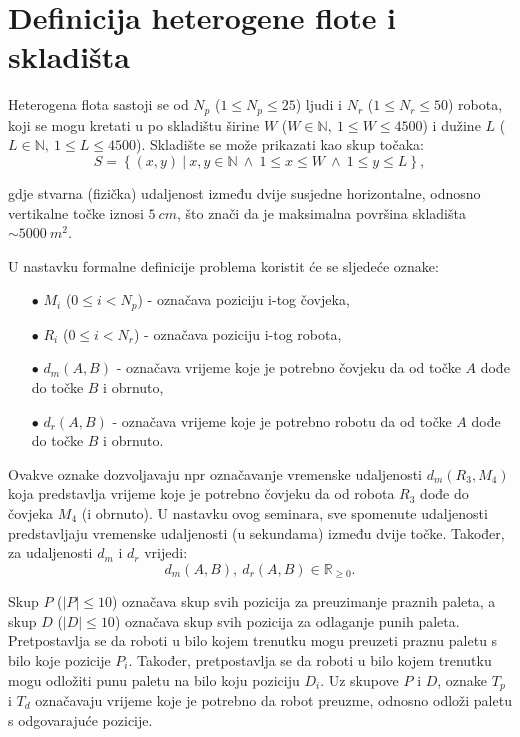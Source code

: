 \documentclass[times, utf8, seminar]{fer}
\begin{document}
\section{Definicija heterogene flote i skladišta}

Heterogena flota sastoji se od $N_p$ ($1 \le N_p \le 25$) ljudi i
 $N_r$ ($1 \le N_r \le 50$) robota,
koji se mogu kretati u po skladištu širine $W$ ($W \in \mathbb{N},\ 1 \le W \le 4500$)
i  dužine $L$ ($L \in \mathbb{N},\ 1 \le L \le 4500$).
Skladište se može prikazati kao skup točaka:
\begin{equation}
S = \left\{(x, y)\ |\ x, y \in \mathbb{N}\ \land\ 1 \le x \le W\ \land\ 1 \le y \le L\right\},
\end{equation}

gdje stvarna (fizička) udaljenost između dvije susjedne horizontalne, odnosno vertikalne točke
iznosi $5\ cm$, što znači da je maksimalna površina skladišta
$\sim5000\ m^2$.

U nastavku formalne definicije problema koristit će se sljedeće oznake:
\begin{itemize}
    \item[$\bullet$] $M_i$ ($0 \le i < N_p$) - označava poziciju i-tog čovjeka,
    \item[$\bullet$] $R_i$ ($0 \le i < N_r$) - označava poziciju i-tog robota,
    \item[$\bullet$] $d_m(A, B)$ - označava vrijeme koje je potrebno čovjeku da od točke $A$ dođe do točke $B$ i obrnuto,
    \item[$\bullet$] $d_r(A, B)$ - označava vrijeme koje je potrebno robotu da od točke $A$ dođe do točke $B$ i obrnuto.
\end{itemize}

Ovakve oznake dozvoljavaju npr označavanje vremenske udaljenosti $d_m(R_3, M_4)$ koja
predstavlja vrijeme koje je potrebno čovjeku da od robota $R_3$ dođe do čovjeka
$M_4$ (i obrnuto).
U nastavku ovog seminara, sve spomenute udaljenosti predstavljaju vremenske udaljenosti (u sekundama) između
dvije točke. Također, za udaljenosti $d_m$ i $d_r$ vrijedi:
\begin{equation}
d_m(A, B),\ d_r(A, B) \in \mathbb{R}_{\ge0}.
\end{equation}

Skup $P$ ($|P| \le 10$) označava skup svih pozicija za preuzimanje praznih paleta,
a skup $D$ ($|D| \le 10$) označava skup svih pozicija za odlaganje punih paleta. Pretpostavlja
se da roboti u bilo kojem trenutku mogu preuzeti praznu paletu s bilo koje pozicije $P_i$.
Također, pretpostavlja se da roboti u bilo kojem trenutku mogu odložiti punu paletu na bilo
koju poziciju $D_i$. Uz skupove $P$ i $D$, oznake $T_p$ i $T_d$ označavaju
vrijeme koje je potrebno da robot preuzme, odnosno odloži paletu s
odgovarajuće pozicije.
\end{document}
